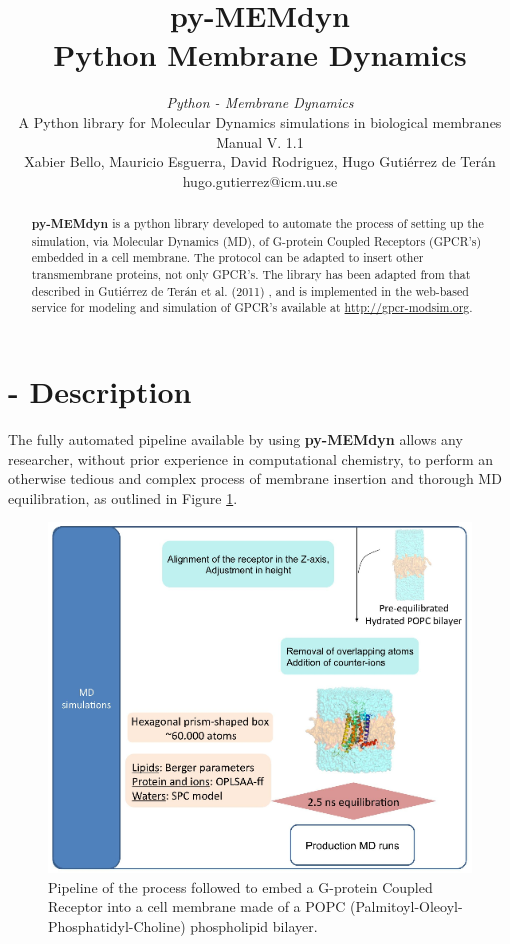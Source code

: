 \documentclass[10pt, oneside, pdftex]{article}
\title{py-MEMdyn \\ 
\large \vspace*{-10pt}Python Membrane Dynamics\vspace*{10pt}}
\author{%
\textit{Python - Membrane Dynamics} \\
A Python library for Molecular Dynamics simulations in biological membranes\\
Manual V. 1.1 \\
Xabier Bello, Mauricio Esguerra, David Rodriguez, Hugo Guti\'{e}rrez de Ter\'{a}n \\
hugo.gutierrez@icm.uu.se \\
\vspace{20pt}
}
\makeatletter
\def\printtitle{%
{\color{bl} \centering \huge  \textbf{\@title}\par}}	%
\def\printauthor{%
{\centering \small \@author}}				%
\makeatother
\begin{document}
\printtitle 
\printauthor

\begin{abstract}
\noindent \textbf{py-MEMdyn} is a python library developed to automate
the process of setting up the simulation, via Molecular Dynamics (MD),
of G-protein  Coupled Receptors (GPCR's) embedded in  a cell membrane.
The protocol  can be adapted  to insert other  transmembrane proteins,
not only GPCR's.  The library  has been adapted from that described in
Guti\'{e}rrez de Ter\'{a}n et al.  (2011) \cite{rodriguez2011}, and is
implemented in  the web-based service  for modeling and  simulation of
GPCR's available at \url{http://gpcr-modsim.org}.
\end{abstract}

\section*{ - Description}
The  fully automated  pipeline available  by  using \textbf{py-MEMdyn}
allows  any  researcher,  without  prior experience  in  computational
chemistry,  to perform  an otherwise  tedious and  complex  process of
membrane  insertion  and thorough  MD  equilibration,  as outlined  in
Figure \ref{fig:pipeline}.

\begin{figure}[htbp]
\centering
\includegraphics[scale=0.6]{pipeline.png}
\caption{Pipeline of the process followed to embed a G-protein Coupled
  Receptor    into    a   cell    membrane    made    of   a   POPC
  (Palmitoyl-Oleoyl-Phosphatidyl-Choline) phospholipid bilayer.}
\label{fig:pipeline}
\end{figure} 
\end{document}
